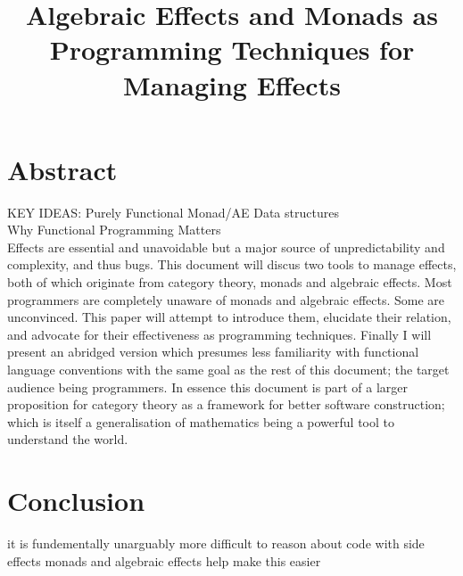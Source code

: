 \documentclass[a4paper,10pt]{article}
\title{Algebraic Effects and Monads as Programming Techniques for Managing Effects}
\theoremstyle{definition}
\begin{document}
\section{Abstract}

KEY IDEAS:
Purely Functional Monad/AE Data structures\\
Why Functional Programming Matters\\

Effects are essential and unavoidable
but a major source of unpredictability
and complexity, and thus bugs.
This document will discus two tools to manage effects,
both of which originate from category theory,
monads and algebraic effects.
Most programmers are completely unaware of monads and algebraic effects.
Some are unconvinced.
This paper will attempt to introduce them,
elucidate their relation,
and advocate for their effectiveness as programming techniques.
Finally I will present an abridged version
which presumes less familiarity with functional language conventions
with the same goal as the rest of this document;
the target audience being programmers.
In essence this document is part of a larger
proposition for category theory as a framework for better software construction;
which is itself a generalisation of mathematics being a powerful tool to understand the world.

\pagebreak
\tableofcontents

\pagebreak


\pagebreak


\pagebreak


\pagebreak


\pagebreak


\pagebreak
\section{Conclusion}
it is fundementally unarguably more difficult to reason about code with side effects
monads and algebraic effects help make this easier

\pagebreak
\appendix



\pagebreak


\end{document}
